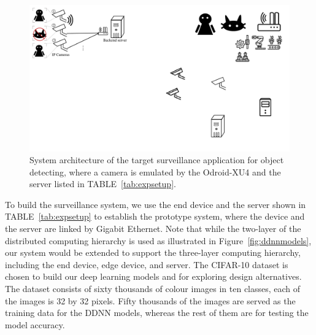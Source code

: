 \documentclass[conference]{IEEEtran}
\def\figurename{Figure}
\def\tablename{TABLE}
\begin{document}
	\begin{figure}[tbh!]
        \centering

        \includegraphics[width=.7\columnwidth]{figure/surveillancesystem.pdf}
        \caption{System architecture of the target surveillance application for object detecting, where a camera is emulated by the Odroid-XU4 and the server listed in \tablename~\ref{tab:expsetup}.}
        \label{fig:targetsysarch} %
    \end{figure}

To build the surveillance system, we use the end device and the server shown in \tablename~\ref{tab:expsetup} to establish the prototype system, where the device and the server are linked by Gigabit Ethernet. Note that while the two-layer of the distributed computing hierarchy is used as illustrated in \figurename~\ref{fig:ddnnmodels}, our system would be extended to support the three-layer computing hierarchy, including the end device, edge device, and server. The CIFAR-10 dataset \cite{krizhevsky2014cifar} is chosen to build our deep learning models and for exploring design alternatives. The dataset consists of sixty thousands of colour images in ten classes, each of the images is 32 by 32 pixels. Fifty thousands of the images are served as the training data for the DDNN models, whereas the rest of them are for testing the model accuracy.
\end{document}
